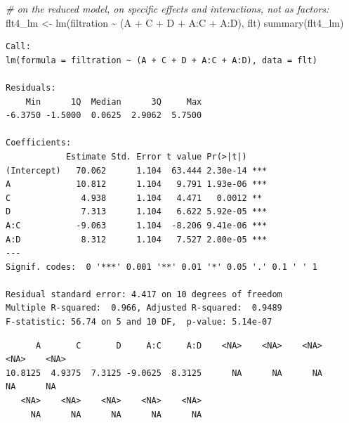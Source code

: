 \documentclass[
]{book}
\newenvironment{Shaded}{\begin{snugshade}}{\end{snugshade}}
\newcommand{\CommentTok}[1]{\textcolor[rgb]{0.56,0.35,0.01}{\textit{#1}}}
\newcommand{\DecValTok}[1]{\textcolor[rgb]{0.00,0.00,0.81}{#1}}
\newcommand{\FunctionTok}[1]{\textcolor[rgb]{0.00,0.00,0.00}{#1}}
\newcommand{\NormalTok}[1]{#1}
\newcommand{\OtherTok}[1]{\textcolor[rgb]{0.56,0.35,0.01}{#1}}
\newcommand{\SpecialCharTok}[1]{\textcolor[rgb]{0.00,0.00,0.00}{#1}}
\begin{document}
\begin{Shaded}
\begin{Highlighting}[]
\CommentTok{\# on the reduced model, on specific effects and interactions, not as factors:}
\NormalTok{flt4\_lm }\OtherTok{\textless{}{-}} \FunctionTok{lm}\NormalTok{(filtration }\SpecialCharTok{\textasciitilde{}}\NormalTok{ (A }\SpecialCharTok{+}\NormalTok{ C }\SpecialCharTok{+}\NormalTok{ D }\SpecialCharTok{+}\NormalTok{ A}\SpecialCharTok{:}\NormalTok{C }\SpecialCharTok{+}\NormalTok{ A}\SpecialCharTok{:}\NormalTok{D), flt)}
\FunctionTok{summary}\NormalTok{(flt4\_lm)}
\end{Highlighting}
\end{Shaded}

\begin{verbatim}
Call:
lm(formula = filtration ~ (A + C + D + A:C + A:D), data = flt)

Residuals:
    Min      1Q  Median      3Q     Max 
-6.3750 -1.5000  0.0625  2.9062  5.7500 

Coefficients:
            Estimate Std. Error t value Pr(>|t|)    
(Intercept)   70.062      1.104  63.444 2.30e-14 ***
A             10.812      1.104   9.791 1.93e-06 ***
C              4.938      1.104   4.471   0.0012 ** 
D              7.313      1.104   6.622 5.92e-05 ***
A:C           -9.063      1.104  -8.206 9.41e-06 ***
A:D            8.312      1.104   7.527 2.00e-05 ***
---
Signif. codes:  0 '***' 0.001 '**' 0.01 '*' 0.05 '.' 0.1 ' ' 1

Residual standard error: 4.417 on 10 degrees of freedom
Multiple R-squared:  0.966,	Adjusted R-squared:  0.9489 
F-statistic: 56.74 on 5 and 10 DF,  p-value: 5.14e-07
\end{verbatim}

\begin{Shaded}
\end{Shaded}

\begin{verbatim}
      A       C       D     A:C     A:D    <NA>    <NA>    <NA>    <NA>    <NA> 
10.8125  4.9375  7.3125 -9.0625  8.3125      NA      NA      NA      NA      NA 
   <NA>    <NA>    <NA>    <NA>    <NA> 
     NA      NA      NA      NA      NA 
\end{verbatim}
\end{document}
